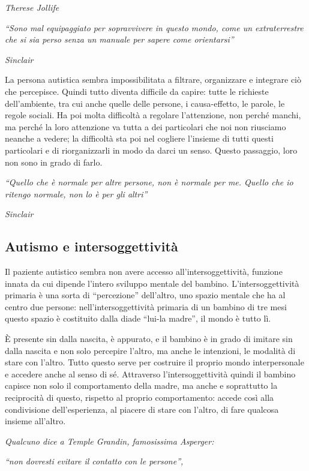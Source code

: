 \emph{Therese Jollife}

\emph{``Sono mal equipaggiato per sopravvivere in questo mondo, come un
extraterrestre che si sia perso senza un manuale per sapere come
orientarsi'' }

\emph{Sinclair}

La persona autistica sembra impossibilitata a filtrare, organizzare e
integrare ciò che percepisce. Quindi tutto diventa difficile da capire:
tutte le richieste dell'ambiente, tra cui anche quelle delle persone, i
causa-effetto, le parole, le regole sociali. Ha poi molta difficoltà a
regolare l'attenzione, non perché manchi, ma perché la loro attenzione
va tutta a dei particolari che noi non riusciamo neanche a vedere; la
difficoltà sta poi nel cogliere l'insieme di tutti questi particolari e
di riorganizzarli in modo da darci un senso. Questo passaggio, loro non
sono in grado di farlo.

\emph{``Quello che è normale per altre persone, non è normale per me.
Quello che io ritengo normale, non lo è per gli altri'' }

\emph{Sinclair}

\subsection{Autismo e intersoggettività}

Il paziente autistico sembra non avere accesso all'intersoggettività,
funzione innata da cui dipende l'intero sviluppo mentale del bambino.
L'intersoggettività primaria è una sorta di ``percezione'' dell'altro,
uno spazio mentale che ha al centro due persone: nell'intersoggettività
primaria di un bambino di tre mesi questo spazio è costituito dalla
diade ``lui-la madre'', il mondo è tutto lì.

È presente sin dalla nascita, è appurato, e il bambino è in grado di
imitare sin dalla nascita e non solo percepire l'altro, ma anche le
intenzioni, le modalità di stare con l'altro. Tutto questo serve per
costruire il proprio mondo interpersonale e accedere anche al senso di
sé. Attraverso l'intersoggettività quindi il bambino capisce non solo il
comportamento della madre, ma anche e soprattutto la reciprocità di
questo, rispetto al proprio comportamento: accede così alla condivisione
dell'esperienza, al piacere di stare con l'altro, di fare qualcosa
insieme all'altro.

\emph{Qualcuno dice a Temple Grandin, famosissima Asperger: }

\emph{``non dovresti evitare il contatto con le persone'', }

